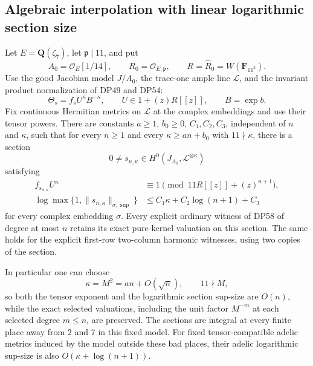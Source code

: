 \subsection{Algebraic interpolation with linear logarithmic section size}

\begin{theorem}\label{DP60}
Let $E=\mathbf Q(\zeta_7)$, let $\mathfrak p\mid11$, and put
\[
 A_0=\mathcal O_E[1/14],\qquad
 R_0=\mathcal O_{E,\mathfrak p},\qquad
 R=\widehat R_0=W(\mathbf F_{11^3}).
\]
Use the good Jacobian model $J/A_0$, the trace-one ample line $\mathcal L$, and the invariant product normalization of DP49 and DP54:
\[
 \Theta_s=f_sU^\kappa B^{-\kappa},
 \qquad U\in1+(z)R[[z]],\qquad B=\exp b.
\]
Fix continuous Hermitian metrics on $\mathcal L$ at the complex embeddings and use their tensor powers.
There are constants $a\ge1$, $b_0\ge0$, $C_1,C_2,C_3$, independent of $n$ and $\kappa$, such that for every $n\ge1$ and every $\kappa\ge an+b_0$ with $11\nmid\kappa$, there is a section
\[
 0\ne s_{n,\kappa}\in H^0(J_{A_0},\mathcal L^{\otimes\kappa})
\]
satisfying
\begin{align}
 f_{s_{n,\kappa}}U^\kappa
 &\equiv1\pmod{11R[[z]]+(z)^{n+1}},
 \label{eq:boundedrepresentativejet}\\
 \log\max\{1,\|s_{n,\kappa}\|_{\sigma,\sup}\}
 &\le C_1\kappa+C_2\log(n+1)+C_3
 \label{eq:linearsectionsize}
\end{align}
for every complex embedding $\sigma$.
Every explicit ordinary witness of DP58 of degree at most $n$ retains its exact pure-kernel valuation on this section.
The same holds for the explicit first-row two-column harmonic witnesses, using two copies of the section.

In particular one can choose
\[
 \kappa=M^2=an+O(\sqrt n),\qquad 11\nmid M,
\]
so both the tensor exponent and the logarithmic section sup-size are $O(n)$, while the exact selected valuations, including the unit factor $M^{-m}$ at each selected degree $m\le n$, are preserved.
The sections are integral at every finite place away from $2$ and $7$ in this fixed model.
For fixed tensor-compatible adelic metrics induced by the model outside these bad places, their adelic logarithmic sup-size is also $O(\kappa+\log(n+1))$.
\end{theorem}

